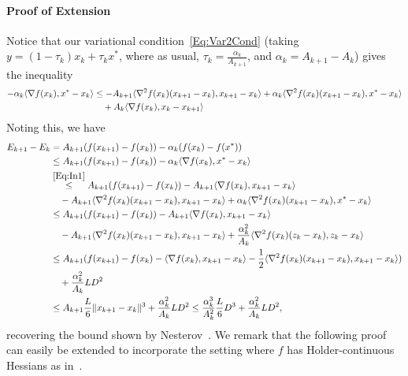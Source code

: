 \documentclass[11pt]{article}
\theoremstyle{plain}
\begin{document}
\paragraph{Proof of Extension}
Notice that our variational condition~\eqref{Eq:Var2Cond} (taking $y = (1- \tau_k)x_k + \tau_k x^\ast$, where as usual, $\tau_k = \frac{\alpha_k}{A_{k+1}}$, and $\alpha_k = A_{k+1} - A_k$) gives the inequality 
\begin{align}\label{Eq:In1}
-\alpha_k\langle \nabla f(x_k), x^\ast - x_k\rangle &\leq - A_{k+1}\langle \nabla^2f(x_k)(x_{k+1} - x_k), x_{k+1} - x_k\rangle + \alpha_k \langle \nabla^2f(x_k)(x_{k+1} - x_k), x^\ast - x_k\rangle\notag\\
&\quad  + A_k \langle \nabla f(x_k), x_k - x_{k+1}\rangle
\end{align}
Noting this, we have 
\begin{subequations}
\begin{align*}
E_{k+1} - E_k %
& = A_{k+1}(f(x_{k+1}) -f(x_k)) - \alpha_k(f(x_k) - f(x^\ast))\notag\\
&\leq A_{k+1}(f(x_{k+1}) -f(x_k)) - \alpha_k\langle \nabla f(x_k), x^\ast - x_k\rangle\\
&\overset{\eqref{Eq:In1}}{\leq} A_{k+1}(f(x_{k+1}) -f(x_k)) - A_{k+1}\langle \nabla f(x_k), x_{k+1}- x_k\rangle\\
&\quad  - A_{k+1} \langle \nabla^2 f(x_k)(x_{k+1} - x_k), x_{k+1} - x_k \rangle  + \alpha_k \langle \nabla^2f(x_k)(x_{k+1} - x_k), x^\ast - x_k\rangle\\
&\leq A_{k+1}(f(x_{k+1}) -f(x_k)) - A_{k+1}\langle \nabla f(x_k), x_{k+1}- x_k\rangle \\
&\quad  - A_{k+1} \langle \nabla^2 f(x_k)(x_{k+1} - x_k), x_{k+1} - x_k \rangle+ \frac{\alpha_k^2}{A_k} \langle \nabla^2f(x_k)(z_k - x_k), z_k - x_k\rangle\\
&\leq A_{k+1}(f(x_{k+1}) -f(x_k) - \langle \nabla f(x_k), x_{k+1}- x_k\rangle - \frac{1}{2}\langle \nabla^2 f(x_k)(x_{k+1} - x_k), x_{k+1} - x_k \rangle)\\
&\quad+\frac{\alpha_k^2}{A_k} LD^2\\
&\leq A_{k+1}\frac{L}{6} \|x_{k+1} - x_k\|^3 +\frac{\alpha_k^2}{A_k} LD^2\leq\frac{\alpha_k^3}{A_k^2}\frac{L}{6} D^3 +\frac{\alpha_k^2}{A_k} LD^2,
\end{align*}
\end{subequations}
recovering the bound shown by Nesterov~\cite[(5.4)]{NesterovCond15}. We remark that the following proof can easily be extended to incorporate the setting where $f$ has  Holder-continuous Hessians as in~\cite{NesterovCond15}.
\end{document}

